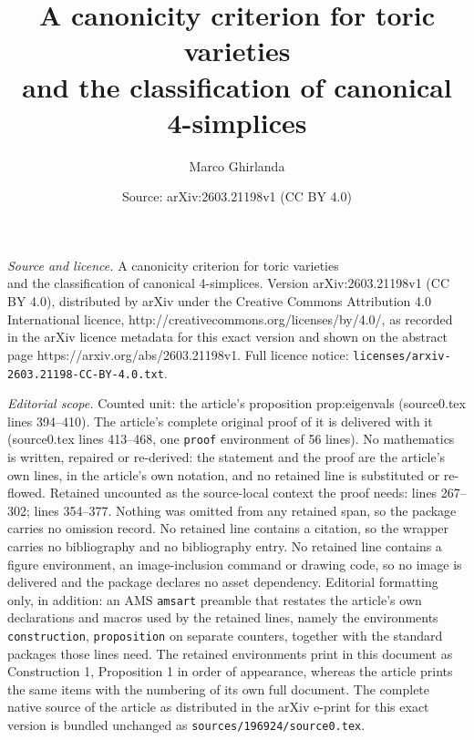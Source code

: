 \documentclass[10pt,a4paper]{amsart}
\title{A canonicity criterion for toric varieties \\ and the classification of canonical 4-simplices}
\author{Marco Ghirlanda}
\date{Source: arXiv:2603.21198v1 (CC BY 4.0)}
\begin{document}
\maketitle

\noindent\emph{Source and licence.} A canonicity criterion for toric varieties \\ and the classification of canonical 4-simplices. Version arXiv:2603.21198v1 (CC BY 4.0), distributed by arXiv under the Creative Commons Attribution 4.0 International licence, http://creativecommons.org/licenses/by/4.0/, as recorded in the arXiv licence metadata for this exact version and shown on the abstract page https://arxiv.org/abs/2603.21198v1. Full licence notice: \texttt{licenses/arxiv-2603.21198-CC-BY-4.0.txt}.\par\smallskip

\noindent\textit{Editorial scope.} Counted unit: the article's proposition prop:eigenvals (source0.tex lines 394--410). The article's complete original proof of it is delivered with it (source0.tex lines 413--468, one \texttt{proof} environment of 56 lines). No mathematics is written, repaired or re-derived: the statement and the proof are the article's own lines, in the article's own notation, and no retained line is substituted or re-flowed.  Retained uncounted as the source-local context the proof needs: lines 267--302; lines 354--377.  Nothing was omitted from any retained span, so the package carries no omission record.  No retained line contains a citation, so the wrapper carries no bibliography and no bibliography entry.  No retained line contains a figure environment, an image-inclusion command or drawing code, so no image is delivered and the package declares no asset dependency.  Editorial formatting only, in addition: an AMS \texttt{amsart} preamble that restates the article's own declarations and macros used by the retained lines, namely the environments \texttt{construction}, \texttt{proposition} on separate counters, together with the standard packages those lines need.  The retained environments print in this document as Construction 1, Proposition 1 in order of appearance, whereas the article prints the same items with the numbering of its own full document.  The complete native source of the article as distributed in the arXiv e-print for this exact version is bundled unchanged as \texttt{sources/196924/source0.tex}.
\end{document}
